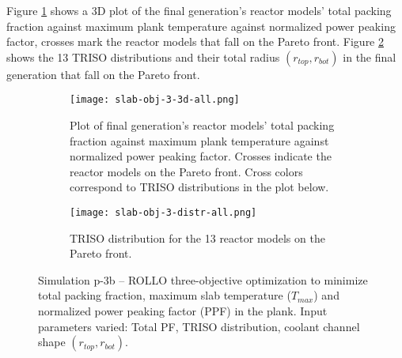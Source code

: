 Figure \ref{fig:slab-obj-3-3d-all} shows a 3D plot of the final generation's reactor 
models' total packing fraction against maximum plank temperature against normalized
power peaking factor, crosses mark the reactor models that fall on the Pareto front.
Figure \ref{fig:slab-obj-3-distr-all} shows the 13 TRISO distributions and their
total radius $(r_{top}, r_{bot})$ in the final generation that fall on the Pareto 
front. 
\begin{figure}[htbp!]
    \begin{subfigure}{\textwidth}
        \centering
        \texttt{[image: slab-obj-3-3d-all.png]}
        \caption{Plot of final generation's reactor models' total packing fraction against maximum plank 
        temperature against normalized power peaking factor. Crosses indicate the reactor models on the 
        Pareto front. Cross colors correspond to TRISO distributions in the plot below.}
        \label{fig:slab-obj-3-3d-all} 
    \end{subfigure}
    \begin{subfigure}{\textwidth}
        \texttt{[image: slab-obj-3-distr-all.png]}
        \caption{TRISO distribution for the 13 reactor models on the Pareto front.}
        \label{fig:slab-obj-3-distr-all} 
    \end{subfigure}
    \caption{Simulation p-3b -- ROLLO three-objective optimization to minimize total packing fraction, 
    maximum slab temperature ($T_{max}$) and normalized power peaking factor (PPF) in the plank. 
    Input parameters varied: Total PF, TRISO distribution, 
    coolant channel shape $(r_{top}, r_{bot})$.}
    \label{fig:slab-obj-3-all}
\end{figure}

